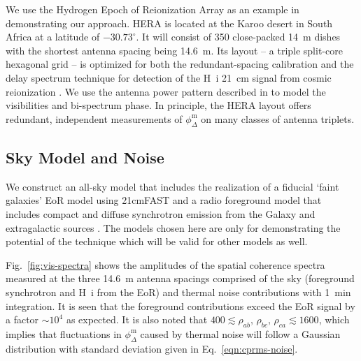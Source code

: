 \documentclass[
reprint,
superscriptaddress,
amsmath,
amssymb,
aps,
prd
]{revtex4-1}
\begin{document}
We use the Hydrogen Epoch of Reionization Array \cite[HERA;][]{deb17,thy16,ewa16,neb16,patra17} as an example in demonstrating our approach. HERA is located at the Karoo desert in South Africa at a latitude of $-30.73^\circ$. It will consist of 350 close-packed 14~m dishes with the shortest antenna spacing being 14.6~m. Its layout -- a triple split-core hexagonal grid -- is optimized for both the redundant-spacing calibration and the delay spectrum technique for detection of the H~{\sc i} 21~cm signal from cosmic reionization \cite{dil16}. We use the antenna power pattern described in \cite{deb17} to model the visibilities and bi-spectrum phase. In principle, the HERA layout offers redundant, independent measurements of $\phi_\Delta^\textrm{m}$ on many classes of antenna triplets. 

\subsection{Sky Model and Noise}\label{sec:skymodel-noise}

We construct an all-sky model that includes the realization of a fiducial `faint galaxies' EoR model \cite{gre17} using 21cmFAST \cite{mes11} and a radio foreground model that includes compact and diffuse synchrotron emission from the Galaxy and extragalactic sources \cite{thy15a}. The models chosen here are only for demonstrating the potential of the technique which will be valid for other models as well.

Fig.~\ref{fig:vis-spectra} shows the amplitudes of the spatial coherence spectra measured at the three 14.6~m antenna spacings comprised of the sky (foreground synchrotron and H~{\sc i} from the EoR) and thermal noise contributions with 1~min integration. It is seen that the foreground contributions exceed the EoR signal by a factor $\sim 10^4$ as expected. It is also noted that $400\lesssim \rho_{ab},\,\rho_{bc},\,\rho_{ca} \lesssim 1600$, which implies that fluctuations in $\phi_\Delta^\textrm{m}$ caused by thermal noise will follow a Gaussian distribution with standard deviation given in Eq.~\ref{eqn:cprms-noise}.
\end{document}
